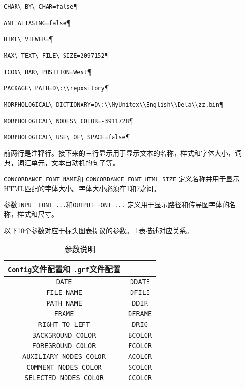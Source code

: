 \verb$CHAR\ BY\ CHAR=false$\P

\verb$ANTIALIASING=false$\P

\verb$HTML\ VIEWER=$\P

\verb$MAX\ TEXT\ FILE\ SIZE=2097152$\P

\verb$ICON\ BAR\ POSITION=West$\P

\verb$PACKAGE\ PATH=D\:\\repository$\P

\verb$MORPHOLOGICAL\ DICTIONARY=D\:\\MyUnitex\\English\\Dela\\zz.bin$\P

\verb$MORPHOLOGICAL\ NODES\ COLOR=-3911728$\P

\verb$MORPHOLOGICAL\ USE\ OF\ SPACE=false$\P


\bigskip
\noindent
前两行是注释行。接下来的三行显示用于显示文本的名称，样式和字体大小，词典，词汇单元，文本自动机的句子等。



\bigskip
\noindent
\verb$CONCORDANCE FONT NAME$和 \verb$CONCORDANCE FONT HTML SIZE$
定义名称并用于显示HTML匹配的字体大小。字体大小必须在1和7之间。

\bigskip
\noindent 
参数\verb$INPUT FONT ...$和\verb$OUTPUT FONT ...$ 定义用于显示路径和传导图字体的名称，样式和尺寸。

\bigskip
\noindent

以下10个参数对应于标头图表提议的参数。 \ref{tab-parameters}表描述对应关系。

\begin{table}[h]
\begin{center}
\begin{tabular}{|c|c|}
\hline
\verb+Config+文件配置和 \verb+.grf+文件配置
\\
\hline
\verb$DATE$ & \verb$DDATE$
\\
\hline
\verb$FILE NAME$ & \verb$DFILE$
\\
\hline
\verb$PATH NAME$ & \verb$DDIR$
\\
\hline
\verb$FRAME$ & \verb$DFRAME$
\\
\hline
\verb$RIGHT TO LEFT$ & \verb$DRIG$
\\
\hline
\verb$BACKGROUND COLOR$ & \verb$BCOLOR$
\\
\hline
\verb$FOREGROUND COLOR$ & \verb$FCOLOR$
\\
\hline
\verb$AUXILIARY NODES COLOR$ & \verb$ACOLOR$
\\
\hline
\verb$COMMENT NODES COLOR$ & \verb$SCOLOR$
\\
\hline
\verb$SELECTED NODES COLOR$ & \verb$CCOLOR$
\\
\hline
\end{tabular}
\caption{参数说明\label{tab-parameters}}
\end{center}
\end{table}

